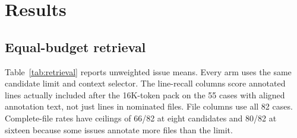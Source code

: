 \documentclass[
]{article}
\begin{document}
\section{Results}\label{results}

\subsection{Equal-budget retrieval}\label{equal-budget-retrieval}

Table~\ref{tab:retrieval} reports unweighted issue means. Every arm uses the same
candidate limit and context selector. The line-recall columns score
annotated lines actually included after the 16K-token pack on the 55
cases with aligned annotation text, not just lines in nominated files.
File columns use all 82 cases. Complete-file rates have ceilings of 66/82 at
eight candidates and 80/82 at sixteen because some issues annotate more
files than the limit.
\end{document}
